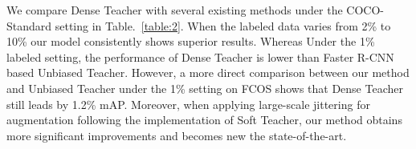 \documentclass[runningheads]{llncs}
\begin{document}
\setlength{\tabcolsep}{5pt}
\begin{table}[bth]
	\begin{center}
		\caption{Experimental results on COCO-Standard. * means our re-implemented results on FCOS,  means large scale jittering is adopted when training}
		\label{table:2}
	\end{center}
\end{table}
\setlength{\tabcolsep}{4pt}

We compare Dense Teacher with several existing methods under the COCO-Standard setting in Table.~\ref{table:2}. When the labeled data varies from 2\% to 10\%  our model consistently shows superior results. Whereas Under the 1\% labeled setting, the performance of Dense Teacher is lower than Faster R-CNN based Unbiased Teacher. However, a more direct comparison between our method and Unbiased Teacher under the 1\% setting on FCOS shows that Dense Teacher still leads by 1.2\% mAP. Moreover, when applying large-scale jittering for augmentation following the implementation of Soft Teacher, our method obtains more significant improvements and becomes new the state-of-the-art.
\end{document}
